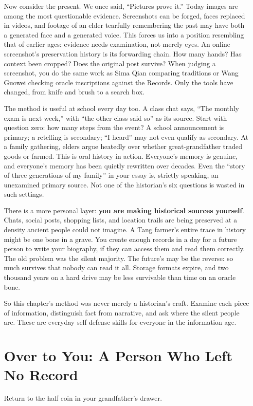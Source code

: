 Now consider the present. We once said, ``Pictures prove it.'' Today images are among the most questionable evidence. Screenshots can be forged, faces replaced in videos, and footage of an elder tearfully remembering the past may have both a generated face and a generated voice. This forces us into a position resembling that of earlier ages: evidence needs examination, not merely eyes. An online screenshot's preservation history is its forwarding chain. How many hands? Has context been cropped? Does the original post survive? When judging a screenshot, you do the same work as Sima Qian comparing traditions or Wang Guowei checking oracle inscriptions against the Records. Only the tools have changed, from knife and brush to a search box.

The method is useful at school every day too. A class chat says, ``The monthly exam is next week,'' with ``the other class said so'' as its source. Start with question zero: how many steps from the event? A school announcement is primary; a retelling is secondary; ``I heard'' may not even qualify as secondary. At a family gathering, elders argue heatedly over whether great-grandfather traded goods or farmed. This is oral history in action. Everyone's memory is genuine, and everyone's memory has been quietly rewritten over decades. Even the ``story of three generations of my family'' in your essay is, strictly speaking, an unexamined primary source. Not one of the historian's six questions is wasted in such settings.

There is a more personal layer: \textbf{you are making historical sources yourself}. Chats, social posts, shopping lists, and location trails are being preserved at a density ancient people could not imagine. A Tang farmer's entire trace in history might be one bone in a grave. You create enough records in a day for a future person to write your biography, if they can access them and read them correctly. The old problem was the silent majority. The future's may be the reverse: so much survives that nobody can read it all. Storage formats expire, and two thousand years on a hard drive may be less survivable than time on an oracle bone.

So this chapter's method was never merely a historian's craft. Examine each piece of information, distinguish fact from narrative, and ask where the silent people are. These are everyday self-defense skills for everyone in the information age.

\section{Over to You: A Person Who Left No Record}
Return to the half coin in your grandfather's drawer.


